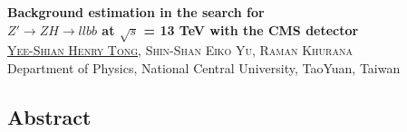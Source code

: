 \documentclass[a0,portrait]{a0poster}
\begin{document}
\begin{center}

  

  \begin{titlebox}
    
    \begin{minipage}[c]{0.085\textwidth}
      \vspace{1em}
    \end{minipage}
    \begin{minipage}[c]{0.80\textwidth}
      \begin{center}
        \color{FireBrick}
        \textbf{\huge Background estimation in the search for \\[0.5em] $Z' \rightarrow ZH \rightarrow llbb$ at $\sqrt{s}$ = 13 TeV with the CMS detector} \\[1.8em]
        \noindent
        \color{Black}
        \textsc{\Large \underline{Yee-Shian Henry Tong}, Shin-Shan Eiko Yu, Raman Khurana} \\[0.8em]
        \noindent
            {\large %
              Department of Physics, National Central University, TaoYuan, Taiwan
            }
      \end{center}
    \end{minipage}
    \begin{minipage}[r]{0.105\textwidth}
    \end{minipage}
    
  \end{titlebox}
  

  \vspace{-0.4em}

  \begin{multicols}{1}
    
    \begin{textbox0}
      \section*{\color{FireBrick} Abstract}
      

\end{textbox0}
\end{multicols}
\end{center}
\end{document}
